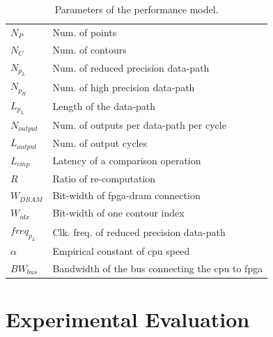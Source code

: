 \begin{table}[t!]
	\begin{spacing}{1.0}
	\caption{Parameters of the performance model.}
	\label{tab:model}
	\centering
	\smallskip
	\begin{tabular}{l|l}
			\hline
			$N_P$			& Num. of points \\
			$N_C$			& Num. of contours \\
			$N_{p_L}$ 		& Num. of reduced precision data-path \\
			$N_{p_H}$ 		& Num. of high precision data-path \\
			$L_{p_L}$			& Length of the data-path \\
			$N_{output}$ 	& Num. of outputs per data-path per cycle \\
			$L_{output}$ 	& Num. of output cycles \\
			$L_{cmp}$			& Latency of a comparison operation \\
			$R$ 			& Ratio of re-computation \\
			$W_{DRAM}$ 		& Bit-width of \gls{fpga}-\gls{dram} connection \\
			$W_{idx}$ 		& Bit-width of one contour index \\
			$freq_{p_L}$  	& Clk. freq. of reduced precision data-path \\
			$\alpha$ 		& Empirical constant of \gls{cpu} speed \\
			$BW_{bus}$ 	& Bandwidth of the bus connecting the \gls{cpu} to \gls{fpga} \\
			\hline
		\end{tabular}
	\end{spacing}
\end{table}

%


\section{Experimental Evaluation}
\label{sec:precision_evaluation}

